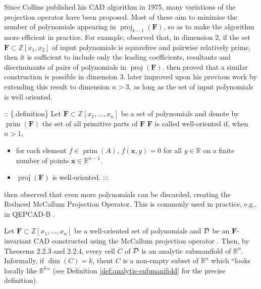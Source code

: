 \documentclass[
]{book}
\theoremstyle{definition}
\theoremstyle{definition}
\theoremstyle{definition}
\theoremstyle{definition}
\theoremstyle{remark}
\begin{document}
Since Collins published his CAD algorithm in 1975, many variations of the projection operator have been proposed. Most of these aim to minimise the number of polynomials appearing in \(\operatorname{proj}_{k-1}(\mathbf{F})\), so as to make the algorithm more efficient in practice.
For example, \citet{collins1975} observed that, in dimension \(2\), if the set \(\mathbf{F} \subset \mathbb{Z}[x_1,x_2]\) of input polynomials is
squarefree and pairwise relatively prime, then it is sufficient to include only the leading
coefficients, resultants and discriminants of pairs of polynomials in \(\operatorname{proj}(\mathbf{F})\). \citet{mccallum1988} then proved that a
similar construction is possible in dimension \(3\).
\citet{mccallum1998} later improved upon his previous work by extending this result to dimension \(n > 3\), as long as the set of input polynomials is well oriented.

:: \{.definition\}
\citep[6.1]{mccallum98}
Let \(\mathbf{F} \subset \mathbb{Z}[x_1, \ldots, x_n]\) be a set of polynomials and denote by \(\operatorname{prim}(\mathbf{F})\) the set of all primitive parts of \(\mathbf{F}\)
\(\mathbf{F}\) is called well-oriented if, when \(n > 1\),

\begin{itemize}
\item
  for each element \(f \in \operatorname{prim}(A)\), \(f(\mathbf{x},y) = 0\) for all \(y\in \mathbb{R}\) on a finite number of points \(\mathbf{x} \in \mathbb{R}^{n-1}\). \citep[condition WO1]{mccallum1998}
\item
  \(\operatorname{proj}(\mathbf{F})\) is well-oriented. \citep[condition WO2]{mccallum1998}
  :::
\end{itemize}

\citet{brown2001} then observed that even more polynomials can be discarded, creating the Reduced McCallum Projection Operator. This is commonly used in practice, e.g., in QEPCAD-B \citep{brownQepcad}.

Let \(\mathbf{F} \subset \mathbb{Z}[x_1,\ldots,x_n]\) be a well-oriented set of polynomials and \(\cal D\) be an \(\mathbf{F}\)-invariant CAD constructed using the McCallum projection operator \citep{mccallum1998}. Then, by \citet{mccallum1988} Theorems 2.2.3 and 2.2.4, every cell \(C\) of \(\cal D\) is an analytic submanifold of \(\mathbb{R}^n\). Informally, if \(\dim(C) = k\), thent \(C\) is a non-empty subset of \(\mathbb{R}^n\) which ``looks locally like \(\mathbb{R}^k\)'' (see Definition \ref{def:analytic-submanifold} for the precise definition).
\end{document}
